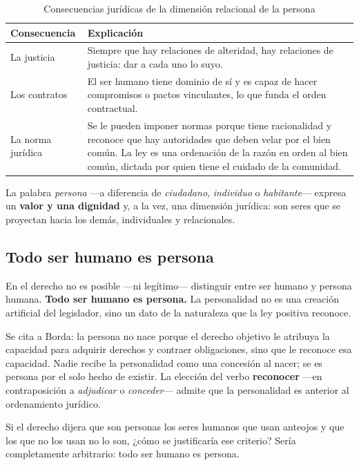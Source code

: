\documentclass[12pt,oneside]{book}
\begin{document}
\begin{table}[H]
\centering
\begin{tabularx}{\textwidth}{B{0.22\textwidth} Y}
\toprule
\textbf{Consecuencia} & \textbf{Explicación} \\
\midrule
La justicia & Siempre que hay relaciones de alteridad, hay relaciones de justicia: dar a cada uno lo suyo. \\
Los contratos & El ser humano tiene dominio de sí y es capaz de hacer compromisos o pactos vinculantes, lo que funda el orden contractual. \\
La norma jurídica & Se le pueden imponer normas porque tiene racionalidad y reconoce que hay autoridades que deben velar por el bien común. La ley es una ordenación de la razón en orden al bien común, dictada por quien tiene el cuidado de la comunidad. \\
\bottomrule
\end{tabularx}
\caption{Consecuencias jurídicas de la dimensión relacional de la persona}
\end{table}

La palabra \emph{persona} ---a diferencia de \emph{ciudadano}, \emph{individuo} o \emph{habitante}--- expresa un \textbf{valor y una dignidad} y, a la vez, una dimensión jurídica: son seres que se proyectan hacia los demás, individuales y relacionales.

\subsection{Todo ser humano es persona}

\begin{importante}
En el derecho no es posible ---ni legítimo--- distinguir entre ser humano y persona humana. \textbf{Todo ser humano es persona.} La personalidad no es una creación artificial del legislador, sino un dato de la naturaleza que la ley positiva reconoce.
\end{importante}

Se cita a Borda: la persona no nace porque el derecho objetivo le atribuya la capacidad para adquirir derechos y contraer obligaciones, sino que le reconoce esa capacidad. Nadie recibe la personalidad como una concesión al nacer; se es persona por el solo hecho de existir. La elección del verbo \textbf{reconocer} ---en contraposición a \emph{adjudicar} o \emph{conceder}--- admite que la personalidad es anterior al ordenamiento jurídico.

\begin{ejemplo}
Si el derecho dijera que son personas los seres humanos que usan anteojos y que los que no los usan no lo son, ¿cómo se justificaría ese criterio? Sería completamente arbitrario: todo ser humano es persona.
\end{ejemplo}
\end{document}
